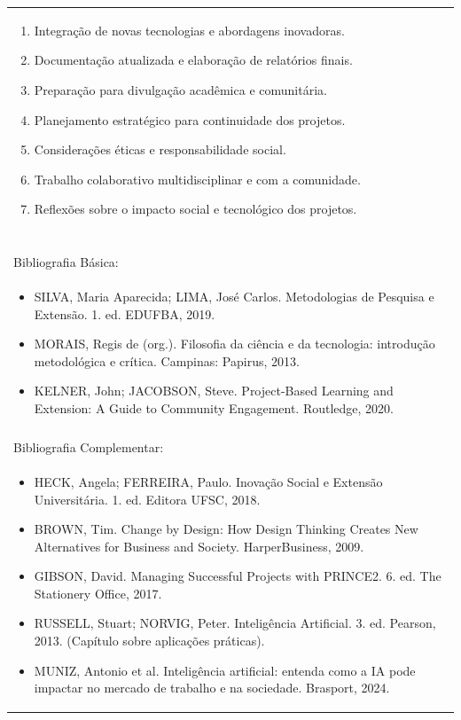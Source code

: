 \documentclass[11pt]{article}
\begin{document}
\begin{center}
\begin{longtable}{|p{4cm}|p{4cm}|p{4cm}|p{4cm}|}
{\begin{enumerate}
\item Integração de novas tecnologias e abordagens inovadoras.
\item Documentação atualizada e elaboração de relatórios finais.
\item Preparação para divulgação acadêmica e comunitária.
\item Planejamento estratégico para continuidade dos projetos.
\item Considerações éticas e responsabilidade social.
\item Trabalho colaborativo multidisciplinar e com a comunidade.
\item Reflexões sobre o impacto social e tecnológico dos projetos.\end{enumerate}}\\
\multicolumn{4}{|p{16cm}|}{}\\
\multicolumn{4}{|p{16cm}|}{}\\
\multicolumn{4}{|p{16cm}|}{\vspace{-1cm}}\\
\multicolumn{4}{|p{16cm}|}{}\\
\hline
\multicolumn{4}{|p{16cm}|}{Bibliografia Básica:}\\
\multicolumn{4}{|p{16cm}|}{%
\begin{itemize}\item SILVA, Maria Aparecida; LIMA, José Carlos. Metodologias de Pesquisa e Extensão. 1. ed. EDUFBA, 2019.
\item MORAIS, Regis de (org.). Filosofia da ciência e da tecnologia: introdução metodológica e crítica. Campinas: Papirus, 2013.
\item KELNER, John; JACOBSON, Steve. Project-Based Learning and Extension: A Guide to Community Engagement. Routledge, 2020.\end{itemize}}\\
\multicolumn{4}{|p{16cm}|}{}\\
\hline
\multicolumn{4}{|p{16cm}|}{Bibliografia Complementar:}\\
\multicolumn{4}{|p{16cm}|}{%
\begin{itemize}\item HECK, Angela; FERREIRA, Paulo. Inovação Social e Extensão Universitária. 1. ed. Editora UFSC, 2018.
\item BROWN, Tim. Change by Design: How Design Thinking Creates New Alternatives for Business and Society. HarperBusiness, 2009.
\item GIBSON, David. Managing Successful Projects with PRINCE2. 6. ed. The Stationery Office, 2017.
\item RUSSELL, Stuart; NORVIG, Peter. Inteligência Artificial. 3. ed. Pearson, 2013. (Capítulo sobre aplicações práticas).
\item MUNIZ, Antonio et al. Inteligência artificial: entenda como a IA pode impactar no mercado de trabalho e na sociedade. Brasport, 2024.\end{itemize}}\\
\hline
\end{longtable}
\end{center}

\clearpage
\end{document}

